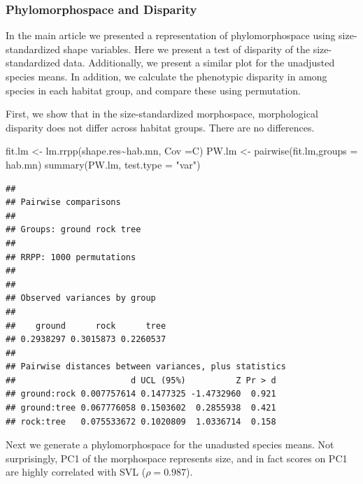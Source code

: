 \documentclass[
  11pt,
]{article}
\newenvironment{Shaded}{\begin{snugshade}}{\end{snugshade}}
\newcommand{\AttributeTok}[1]{\textcolor[rgb]{0.77,0.63,0.00}{#1}}
\newcommand{\DecValTok}[1]{\textcolor[rgb]{0.00,0.00,0.81}{#1}}
\newcommand{\FunctionTok}[1]{\textcolor[rgb]{0.00,0.00,0.00}{#1}}
\newcommand{\NormalTok}[1]{#1}
\newcommand{\OtherTok}[1]{\textcolor[rgb]{0.56,0.35,0.01}{#1}}
\newcommand{\SpecialCharTok}[1]{\textcolor[rgb]{0.00,0.00,0.00}{#1}}
\newcommand{\StringTok}[1]{\textcolor[rgb]{0.31,0.60,0.02}{#1}}
\begin{document}
\hypertarget{phylomorphospace-and-disparity}{%
\subsubsection{Phylomorphospace and
Disparity}\label{phylomorphospace-and-disparity}}

In the main article we presented a representation of phylomorphospace
using size-standardized shape variables. Here we present a test of
disparity of the size-standardized data. Additionally, we present a
similar plot for the unadjusted species means. In addition, we calculate
the phenotypic disparity in among species in each habitat group, and
compare these using permutation.

First, we show that in the size-standardized morphospace, morphological
disparity does not differ across habitat groups. There are no
differences.

\begin{Shaded}
\begin{Highlighting}[]
\NormalTok{fit.lm }\OtherTok{\textless{}{-}} \FunctionTok{lm.rrpp}\NormalTok{(shape.res}\SpecialCharTok{\textasciitilde{}}\NormalTok{hab.mn, }\AttributeTok{Cov =}\NormalTok{C)}
\NormalTok{PW.lm }\OtherTok{\textless{}{-}} \FunctionTok{pairwise}\NormalTok{(fit.lm,}\AttributeTok{groups =}\NormalTok{ hab.mn)}
\FunctionTok{summary}\NormalTok{(PW.lm, }\AttributeTok{test.type =} \StringTok{"var"}\NormalTok{)}
\end{Highlighting}
\end{Shaded}

\begin{verbatim}
## 
## Pairwise comparisons
## 
## Groups: ground rock tree 
## 
## RRPP: 1000 permutations
## 
## 
## Observed variances by group
## 
##    ground      rock      tree 
## 0.2938297 0.3015873 0.2260537 
## 
## Pairwise distances between variances, plus statistics
##                       d UCL (95%)          Z Pr > d
## ground:rock 0.007757614 0.1477325 -1.4732960  0.921
## ground:tree 0.067776058 0.1503602  0.2855938  0.421
## rock:tree   0.075533672 0.1020809  1.0336714  0.158
\end{verbatim}

Next we generate a phylomorphospace for the unadusted species means. Not
surprisingly, PC1 of the morphospace represents size, and in fact scores
on PC1 are highly correlated with SVL (\(\rho=0.987\)).

\begin{Shaded}
\end{Shaded}
\end{document}
